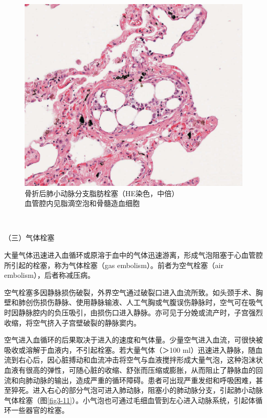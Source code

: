 \begin{figure}[!htbp]
\centering
\includegraphics{./images/Image00044.jpg}
\caption{骨折后肺小动脉分支脂肪栓塞（HE染色，中倍） \\ {\small 血管腔内见脂滴空泡和骨髓造血细胞}}
\label{fig3-10} 
\end{figure} 　


{（三）气体栓塞}

大量气体迅速进入血循环或原溶于血中的气体迅速游离，形成气泡阻塞于心血管腔所引起的栓塞，称为气体栓塞（gas
embolism）。前者为空气栓塞（air embolism），后者称减压病。

空气栓塞多因静脉损伤破裂，外界空气通过破裂口进入血流所致。如头颈手术、胸壁和肺创伤损伤静脉、使用静脉输液、人工气胸或气腹误伤静脉时，空气可在吸气时因静脉腔内的负压吸引，由损伤口进入静脉。亦可见于分娩或流产时，子宫强烈收缩，将空气挤入子宫壁破裂的静脉窦内。

空气进入血循环的后果取决于进入的速度和气体量。少量空气进入血流，可很快被吸收或溶解于血液内，不引起栓塞。若大量气体（＞100
ml）迅速进入静脉，随血流到右心后，因心脏搏动和血流冲击将空气与血液搅拌形成大量气泡，这种泡沫状血液有很高的弹性，可随心脏的收缩、舒张而压缩或膨胀，从而阻止了静脉血的回流和向肺动脉的输出，造成严重的循环障碍。患者可出现严重发绀和呼吸困难，甚至猝死。进入右心的部分气泡可进入肺动脉，阻塞小的肺动脉分支，引起肺小动脉气体栓塞（图\ref{fig3-11}）。小气泡也可通过毛细血管到左心进入动脉系统，引起体循环一些器官的栓塞。

